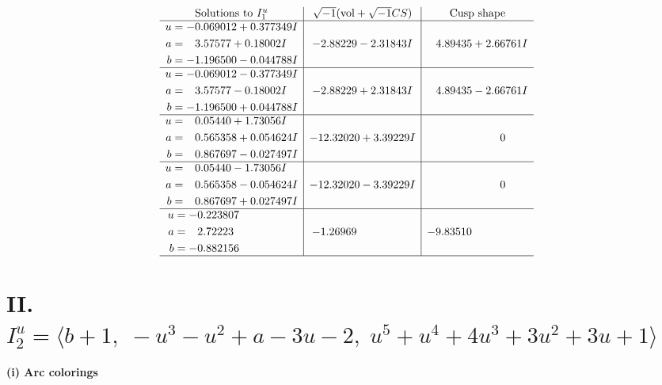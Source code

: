 \documentclass[1p]{elsarticle_modified}
\theoremstyle{definition}
\newcommand{\I}{\sqrt{-1}}
\begin{document}
$$\begin{array}{c|c|c}
\text{Solutions to }I^u_{1}& \I (\text{vol} + \sqrt{-1}CS) & \text{Cusp shape}\\
 \hline 
\begin{aligned}
u &= -0.069012 + 0.377349 I \\
a &= \phantom{-}3.57577 + 0.18002 I \\
b &= -1.196500 - 0.044788 I\end{aligned}
 & -2.88229 - 2.31843 I & \phantom{-}4.89435 + 2.66761 I \\ \hline\begin{aligned}
u &= -0.069012 - 0.377349 I \\
a &= \phantom{-}3.57577 - 0.18002 I \\
b &= -1.196500 + 0.044788 I\end{aligned}
 & -2.88229 + 2.31843 I & \phantom{-}4.89435 - 2.66761 I \\ \hline\begin{aligned}
u &= \phantom{-}0.05440 + 1.73056 I \\
a &= \phantom{-}0.565358 + 0.054624 I \\
b &= \phantom{-}0.867697 - 0.027497 I\end{aligned}
 & -12.32020 + 3.39229 I & \phantom{-0.000000 } 0 \\ \hline\begin{aligned}
u &= \phantom{-}0.05440 - 1.73056 I \\
a &= \phantom{-}0.565358 - 0.054624 I \\
b &= \phantom{-}0.867697 + 0.027497 I\end{aligned}
 & -12.32020 - 3.39229 I & \phantom{-0.000000 } 0 \\ \hline\begin{aligned}
u &= -0.223807\phantom{ +0.000000I} \\
a &= \phantom{-}2.72223\phantom{ +0.000000I} \\
b &= -0.882156\phantom{ +0.000000I}\end{aligned}
 & -1.26969\phantom{ +0.000000I} & -9.83510\phantom{ +0.000000I}\\
 \hline 
 \end{array}$$\newpage\newpage\renewcommand{\arraystretch}{1}
\centering \section*{II. $I^u_{2}= \langle b+1,\;- u^3- u^2+a-3 u-2,\;u^5+u^4+4 u^3+3 u^2+3 u+1 \rangle$}
\flushleft \textbf{(i) Arc colorings}\\
\end{document}
